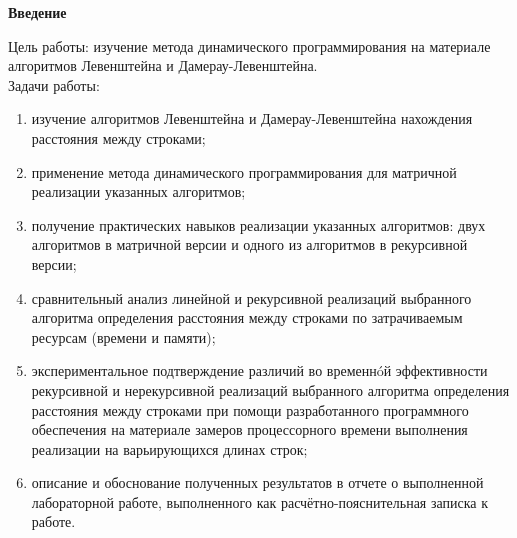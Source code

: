 \documentclass[a4paper,12pt]{report}
\begin{document}
	\setcounter{page}{2}
	
    \begin{center}
        \textbf{Введение\\}
        \begin{flushleft}
			Цель работы: изучение метода динамического программирования на материале алгоритмов Левенштейна и Дамерау-Левенштейна.\\
			Задачи работы:\\
			\begin{enumerate} 
				\item изучение алгоритмов Левенштейна и Дамерау-Левенштейна нахождения расстояния между строками;\\
				\item применение метода динамического программирования для матричной реализации указанных алгоритмов;\\
				\item получение практических навыков реализации указанных алгоритмов: двух алгоритмов в матричной версии и одного из алгоритмов в рекурсивной версии;\\
				\item сравнительный анализ линейной и рекурсивной реализаций выбранного алгоритма определения расстояния между строками по затрачиваемым ресурсам (времени и памяти);\\
				\item экспериментальное подтверждение различий во временнóй эффективности рекурсивной и нерекурсивной реализаций выбранного алгоритма определения расстояния между строками при помощи разработанного программного обеспечения на материале замеров процессорного времени выполнения реализации на варьирующихся длинах строк;\\
				\item описание и обоснование полученных результатов в отчете о выполненной лабораторной работе, выполненного как расчётно-пояснительная записка к работе.\\
			\end{enumerate}
        \end{flushleft}
        \label{sec:intro}
    \end{center}

    \newpage
\end{document}
